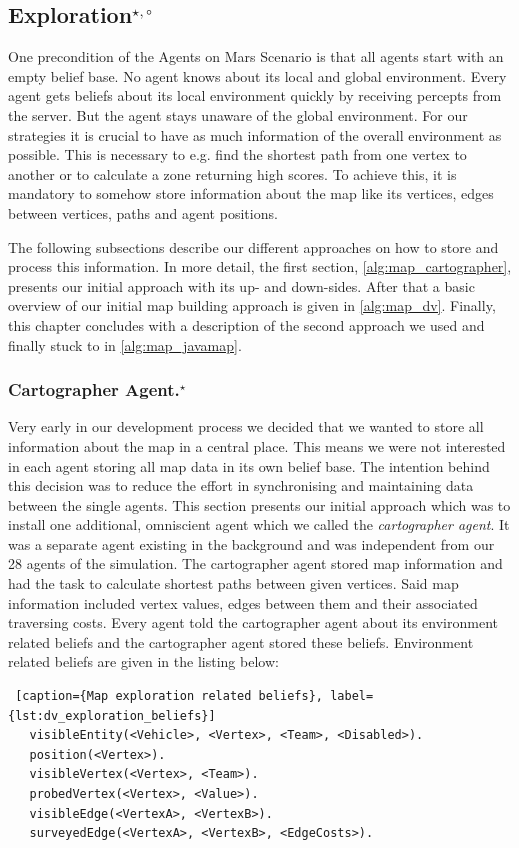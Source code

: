 \subsection[Exploration]{Exploration$^{\star,\circ}$}\label{alg:exploration} %
One precondition of the Agents on Mars Scenario is that all agents start with an empty belief base.
No agent knows about its local and global environment.
Every agent gets beliefs about its local environment quickly by receiving percepts from the server.
But the agent stays unaware of the global environment.
For our strategies it is crucial to have as much information of the overall environment as possible.
This is necessary to e.g. find the shortest path from one vertex to another or to calculate a zone returning high scores.
To achieve this, it is mandatory to somehow store information about the map like its vertices, edges between vertices, paths and agent positions.

The following subsections describe our different approaches on how to store and process this information.
In more detail, the first section, \autoref{alg:map_cartographer}, presents our initial approach with its up- and down-sides.
After that a basic overview of our initial map building approach is given in \autoref{alg:map_dv}.
Finally, this chapter concludes with a description of the second approach we used and finally stuck to in \autoref{alg:map_javamap}.

\subsubsection[Cartographer Agent]{Cartographer Agent.$^\star$}\label{alg:map_cartographer}
Very early in our development process we decided that we wanted to store all information about the map in a central place.
This means we were not interested in each agent storing all map data in its own belief base.
The intention behind this decision was to reduce the effort in synchronising and maintaining data between the single agents.
This section presents our initial approach which was to install one additional, omniscient agent which we called the \emph{cartographer agent}.
It was a separate agent existing in the background and was independent from our 28 agents of the simulation.
The cartographer agent stored map information and had the task to calculate shortest paths between given vertices.
Said map information included vertex values, edges between them and their associated traversing costs.
Every agent told the cartographer agent about its environment related beliefs and the cartographer agent stored these beliefs.
Environment related beliefs are given in the listing below:
\begin{lstlisting} [caption={Map exploration related beliefs}, label={lst:dv_exploration_beliefs}]
   visibleEntity(<Vehicle>, <Vertex>, <Team>, <Disabled>).
   position(<Vertex>).
   visibleVertex(<Vertex>, <Team>).
   probedVertex(<Vertex>, <Value>).
   visibleEdge(<VertexA>, <VertexB>).
   surveyedEdge(<VertexA>, <VertexB>, <EdgeCosts>).
\end{lstlisting}


